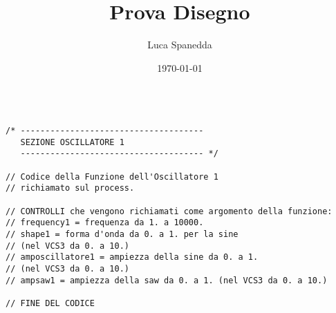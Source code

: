 \documentclass{article}
\begin{document}
\title{Prova Disegno}
\author{Luca Spanedda}
\date{\today}
\maketitle


\begin{verbatim}

/* -------------------------------------
   SEZIONE OSCILLATORE 1
   ------------------------------------- */

// Codice della Funzione dell'Oscillatore 1 
// richiamato sul process.

// CONTROLLI che vengono richiamati come argomento della funzione: 
// frequency1 = frequenza da 1. a 10000.
// shape1 = forma d'onda da 0. a 1. per la sine 
// (nel VCS3 da 0. a 10.)
// amposcillatore1 = ampiezza della sine da 0. a 1. 
// (nel VCS3 da 0. a 10.)
// ampsaw1 = ampiezza della saw da 0. a 1. (nel VCS3 da 0. a 10.)

// FINE DEL CODICE

\end{verbatim}
\end{document}
